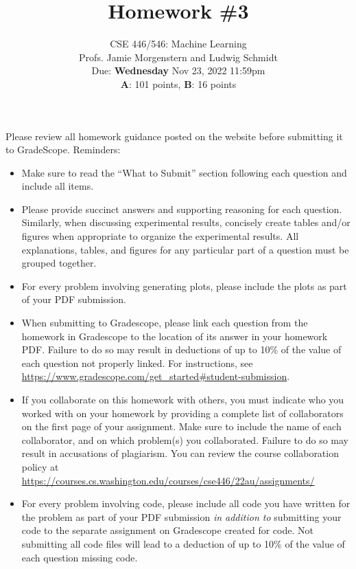 \documentclass{article}
\begin{document}
\setcounter{aprob}{0}
\title{Homework \#3}
\author{
    \normalsize{CSE 446/546: Machine Learning}\\
    \normalsize{Profs. Jamie Morgenstern and Ludwig Schmidt}\\
    \normalsize{Due: \textbf{Wednesday} Nov 23, 2022 11:59pm} \\
    \normalsize{\textbf{A}: 101 points, \textbf{B}: 16 points}
}
\date{{}}
\maketitle

\noindent Please review all homework guidance posted on the website before submitting it to GradeScope. Reminders:
\begin{itemize}
    \item Make sure to read the ``What to Submit'' section following each question and include all items.
    \item Please provide succinct answers and supporting reasoning for each question. Similarly, when discussing experimental results, concisely create tables and/or figures when appropriate to organize the experimental results. All explanations, tables, and figures for any particular part of a question must be grouped together.
    \item For every problem involving generating plots, please include the plots as part of your PDF submission.
    \item When submitting to Gradescope, please link each question from the homework in Gradescope to the location of its answer in your homework PDF. Failure to do so may result in deductions of up to 10\% of the value of each question not properly linked. For instructions, see \url{https://www.gradescope.com/get_started#student-submission}.
    \item If you collaborate on this homework with others, you must indicate who you worked with on your homework by providing a complete list of collaborators on the first page of your assignment. Make sure to include the name of each collaborator, and on which problem(s) you collaborated. Failure to do so may result in accusations of plagiarism. You can review the course collaboration policy at \url{https://courses.cs.washington.edu/courses/cse446/22au/assignments/}
    \item For every problem involving code, please include all code you have written for the problem as part of your PDF submission \emph{in addition to} submitting your code to the separate assignment on Gradescope created for code. Not submitting all code files will lead to a deduction of up to 10\% of the value of each question missing code.  
\end{itemize}
\end{document}
